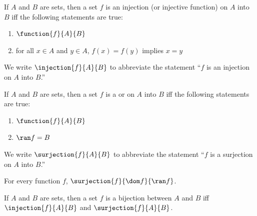\begin{dfn}[Injection]
     \label{dfn:metatheory-injection}
    If \( A \) and \( B \) are sets, then a set \( f \) is an injection (or injective function) on \( A \) into \( B \) iff the following statements are true:
    \begin{enumerate}[topsep=2pt,label=\textup{\texttt{(\alph*)}}]
        \item \( \function{f}{A}{B} \)
        \item for all \( x \in A \) and \( y \in A \), \( f(x) = f(y) \) implies \( x = y \)
    \end{enumerate}
\end{dfn}

\begin{notation}
    We write \( \injection{f}{A}{B} \) to abbreviate the statement ``\( f \) is an injection on \( A \) into \( B \).''
\end{notation}

\begin{dfn}[Surjection]
     \label{dfn:metatheory-surjection}
    If \( A \) and \( B \) are sets, then a set \( f \) is a  or  on \( A \) into \( B \) iff the following statements are true:
    \begin{enumerate}[topsep=2pt,label=\textup{\texttt{(\alph*)}}]
        \item \( \function{f}{A}{B} \)
        \item \( \ran f = B \)
    \end{enumerate}
\end{dfn}

\begin{notation}
    We write \( \surjection{f}{A}{B} \) to abbreviate the statement ``\( f \) is a surjection on \( A \) into \( B \).''
\end{notation}

\begin{cor}
     \label{cor:metatheory-every-function-is-a-surjection-on-its-domain-into-its-range}
    For every function \( f \), \( \surjection{f}{\dom f}{\ran f} \).
\end{cor}

\begin{dfn}[Bijection]
     \label{dfn:metatheory-bijection}
    If \( A \) and \( B \) are sets, then a set \( f \) is a bijection between \( A \) and \( B \) iff
    \( \injection{f}{A}{B} \) and \( \surjection{f}{A}{B} \).
\end{dfn}

